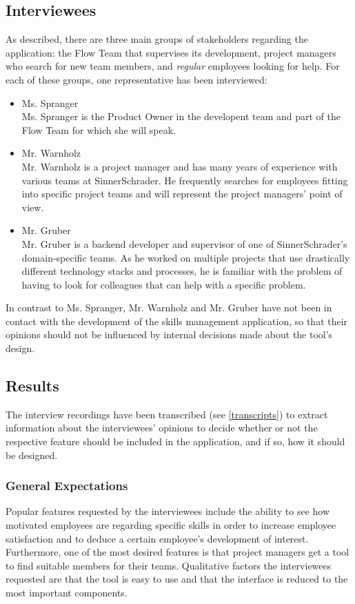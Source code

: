 \newpage

\subsection{Interviewees}
As described, there are three main groups of stakeholders regarding the application: the Flow Team that supervises its development, project managers who search for new team members, and \textit{regular} employees looking for help. For each of these groups, one representative has been interviewed:
\begin{itemize}
	\item Ms. Spranger\\
	Ms. Spranger is the Product Owner in the developent team and part of the Flow Team for which she will speak.
	\item Mr. Warnholz\\
	Mr. Warnholz is a project manager and has many years of experience with various teams at SinnerSchrader. He frequently searches for
	employees fitting into specific project teams and will represent the project managers' point of view.
	\item Mr. Gruber\\
	Mr. Gruber is a backend developer and supervisor of one of SinnerSchrader's domain-specific teams. As he worked on multiple projects that
	use drastically different technology stacks and processes, he is familiar with the problem of having to look for colleagues that can help with a specific problem.
\end{itemize}
In contrast to Ms. Spranger, Mr. Warnholz and Mr. Gruber have not been in contact with the development of the skills management application, so that their opinions should not be influenced by internal decisions made about the tool's design.

\subsection{Results}
The interview recordings have been transcribed (see \ref{transcripts}) to extract information about the interviewees' opinions to decide whether or not the respective feature should be included in the application, and if so, how it should be designed.

\subsubsection{General Expectations}
Popular features requested by the interviewees include the ability to see how motivated employees are regarding specific skills in order to increase employee satisfaction and to deduce a certain employee's development of interest. Furthermore, one of the most desired features is that project managers get a tool to find suitable members for their teams. Qualitative factors the interviewees requested are that the tool is easy to use and that the interface is reduced to the most important components.

